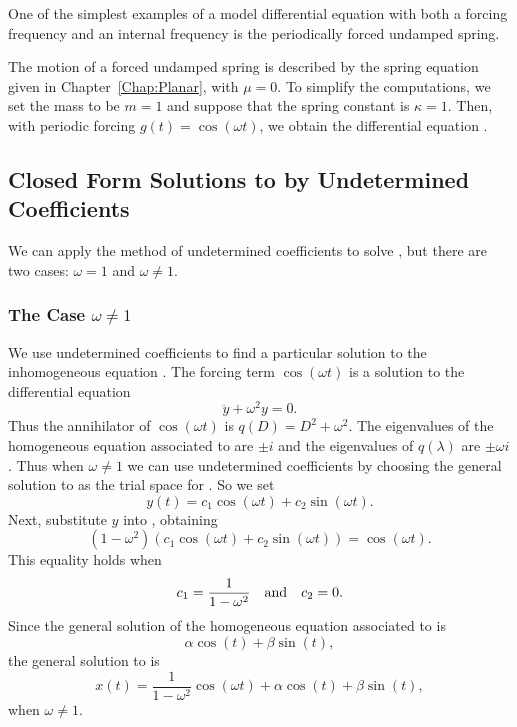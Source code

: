 \documentclass{ximera}
\begin{document}
One of the simplest examples of a model differential equation with both a
forcing frequency and an internal frequency is the periodically forced 
 undamped spring.

The motion of a forced undamped spring is described by the spring equation 
given in Chapter~\ref{Chap:Planar},  with $\mu = 0$.
To simplify the computations, we set the mass to be $m=1$ and suppose that 
the spring constant is $\kappa=1$.  Then, with periodic forcing 
$g(t)=\cos(\omega t)$, we obtain the differential equation .

\subsection*{Closed Form Solutions to  by Undetermined 
Coefficients}

We can apply the method of undetermined coefficients to solve , 
but there are two cases: $\omega=1$ and $\omega\neq 1$. 

\subsubsection*{The Case $\omega\not= 1$}  

We use undetermined coefficients to find a particular solution to the 
inhomogeneous equation .  The forcing term $\cos(\omega t)$ is 
a solution to the differential equation 
\begin{equation}  \label{E:omega}
\ddot{y} + \omega^2y = 0.
\end{equation}
Thus the annihilator 
of $\cos(\omega t)$ is $q(D)=D^2+\omega^2$.  The 
eigenvalues of the homogeneous equation associated to  are 
$\pm i$ and the eigenvalues of $q(\lambda)$ are $\pm\omega i$.  Thus when 
$\omega\neq 1$ we can use undetermined coefficients by choosing the general 
solution to  as the trial space 
for .  So we set
\[
y(t) = c_1\cos(\omega t) + c_2\sin(\omega t).
\]
Next, substitute $y$ into , obtaining
\[
(1-\omega ^2)(c_1\cos(\omega t) + c_2\sin(\omega t)) = \cos(\omega t).
\]
This equality holds when 
\[
c_1 = \frac{1}{1-\omega ^2} \quad\mbox{and}\quad c_2=0.
\]
Since the general solution of the 
homogeneous equation associated 
to  is
\[
\alpha \cos(t)+\beta\sin(t),
\]
the general solution to  is
\[
x(t) =\frac{1}{1-\omega ^2}\cos(\omega t) + \alpha\cos(t) + \beta\sin(t),
\]
when $\omega \neq 1$. 
\end{document}
